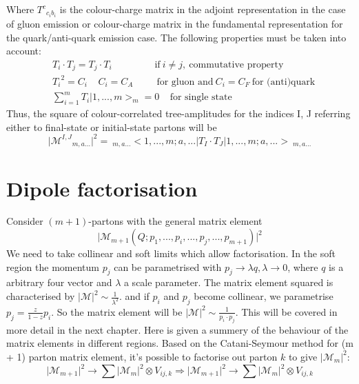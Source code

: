 Where $ {T^c}_{c_ib_i} $ is the colour-charge matrix in the adjoint representation in the case of gluon emission or colour-charge matrix in the fundamental representation for the quark/anti-quark emission case. The following properties must be taken into account:
\begin{equation}
\begin{split}
&T_i \cdot T_j = T_j \cdot T_i \:\:\:\:\:\:\:\:\:\:\:\:\:\:\:\:\:\:\:\:\text{if}\:i\neq j,\: \text{commutative property}\\
& {T_i}^2 = C_i\:\:\:\:\:C_i = C_A \:\:\:\:\:\:\:\:\:\:\:\text{for gluon and} \: C_i = C_F\:\text{for (anti)quark}\\
&\sum_{i=1}^m T_i |1,...,m>_m =0 \:\:\:\:\:\text{for single state}
\end{split}
\end{equation}
Thus, the square of colour-correlated tree-amplitudes for the indices I, J referring either to final-state or initial-state partons will be~\cite{Catani:1996vz, Catani:2002hc}
\begin{equation}
\vert {{\mathcal{M}}^{I,J}}_{m,a...} \vert^2=\:_{m,a...} < 1,...,m;a,... |T_I \cdot T_J | 1,...,m;a,... >\:_{m,a...}
\end{equation}



\section*{Dipole factorisation}
Consider $(m+1)$-partons with the general matrix element~\cite{Seymour:1994we, Catani:2002hc}
\begin{equation}
\vert {{\mathcal{M}}}_{m+1} (Q; p_1,...,p_i,...,p_j,...,p_{m+1}) \vert^2
\end{equation}
We need to take collinear and soft limits which allow factorisation.
In the soft region the momentum $ p_j $ can be parametrised with $ p_j \rightarrow \lambda q, \lambda \rightarrow 0 $, where $ q $ is a arbitrary four vector and $ \lambda $ a scale parameter. 
The matrix element squared is characterised by $ \vert {{\mathcal{M}}} \vert^2 \sim \frac{1}{\lambda^2}$. and if $ p_i $ and $ p_j $ become collinear, we parametrise $ p_j = \frac{z}{1-z} p_i $. So the matrix element will be $ \vert {{\mathcal{M}}} \vert^2 \sim \frac{1}{p_i \cdot p_j}$.
This will be covered in more detail in the next chapter. Here is given a summery of the behaviour of the matrix elements in different regions.
Based on the Catani-Seymour method for (m + 1) parton matrix element, it's possible to factorise out parton $k$ to give $ \vert {{\mathcal{M}}}_{m}  \vert^2 $:
\begin{equation}
\vert {{\mathcal{M}}}_{m+1}  \vert^2 \rightarrow \sum \vert {{\mathcal{M}}}_{m}  \vert^2 \otimes V_{ij,k}
\Rightarrow \vert {{\mathcal{M}}}_{m+1}  \vert^2 \rightarrow \sum \vert {{\mathcal{M}}}_{m}  \vert^2 \otimes V_{ij,k}
\end{equation}

